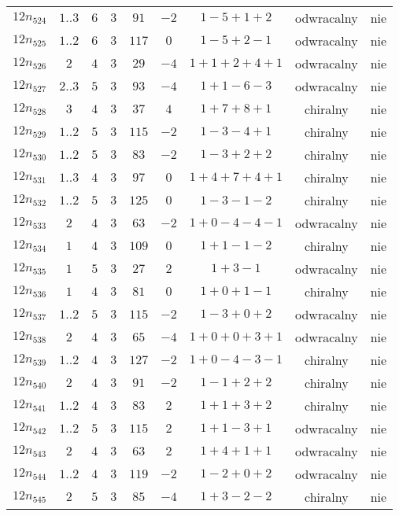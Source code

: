 \begin{longtable}{ccccccccc}
$12n_{524}$ & $1..3$ & $6$ & $3$ & $91$ & $-2$ & $1-5+1+2$ & odwracalny & nie \\
$12n_{525}$ & $1..2$ & $6$ & $3$ & $117$ & $0$ & $1-5+2-1$ & odwracalny & nie \\
$12n_{526}$ & $2$ & $4$ & $3$ & $29$ & $-4$ & $1+1+2+4+1$ & odwracalny & nie \\
$12n_{527}$ & $2..3$ & $5$ & $3$ & $93$ & $-4$ & $1+1-6-3$ & odwracalny & nie \\
$12n_{528}$ & $3$ & $4$ & $3$ & $37$ & $4$ & $1+7+8+1$ & chiralny & nie \\
$12n_{529}$ & $1..2$ & $5$ & $3$ & $115$ & $-2$ & $1-3-4+1$ & chiralny & nie \\
$12n_{530}$ & $1..2$ & $5$ & $3$ & $83$ & $-2$ & $1-3+2+2$ & chiralny & nie \\
$12n_{531}$ & $1..3$ & $4$ & $3$ & $97$ & $0$ & $1+4+7+4+1$ & chiralny & nie \\
$12n_{532}$ & $1..2$ & $5$ & $3$ & $125$ & $0$ & $1-3-1-2$ & chiralny & nie \\
$12n_{533}$ & $2$ & $4$ & $3$ & $63$ & $-2$ & $1+0-4-4-1$ & odwracalny & nie \\
$12n_{534}$ & $1$ & $4$ & $3$ & $109$ & $0$ & $1+1-1-2$ & chiralny & nie \\
$12n_{535}$ & $1$ & $5$ & $3$ & $27$ & $2$ & $1+3-1$ & odwracalny & nie \\
$12n_{536}$ & $1$ & $4$ & $3$ & $81$ & $0$ & $1+0+1-1$ & chiralny & nie \\
$12n_{537}$ & $1..2$ & $5$ & $3$ & $115$ & $-2$ & $1-3+0+2$ & odwracalny & nie \\
$12n_{538}$ & $2$ & $4$ & $3$ & $65$ & $-4$ & $1+0+0+3+1$ & odwracalny & nie \\
$12n_{539}$ & $1..2$ & $4$ & $3$ & $127$ & $-2$ & $1+0-4-3-1$ & chiralny & nie \\
$12n_{540}$ & $2$ & $4$ & $3$ & $91$ & $-2$ & $1-1+2+2$ & chiralny & nie \\
$12n_{541}$ & $1..2$ & $4$ & $3$ & $83$ & $2$ & $1+1+3+2$ & chiralny & nie \\
$12n_{542}$ & $1..2$ & $5$ & $3$ & $115$ & $2$ & $1+1-3+1$ & odwracalny & nie \\
$12n_{543}$ & $2$ & $4$ & $3$ & $63$ & $2$ & $1+4+1+1$ & odwracalny & nie \\
$12n_{544}$ & $1..2$ & $4$ & $3$ & $119$ & $-2$ & $1-2+0+2$ & odwracalny & nie \\
$12n_{545}$ & $2$ & $5$ & $3$ & $85$ & $-4$ & $1+3-2-2$ & chiralny & nie \\

\end{longtable}
